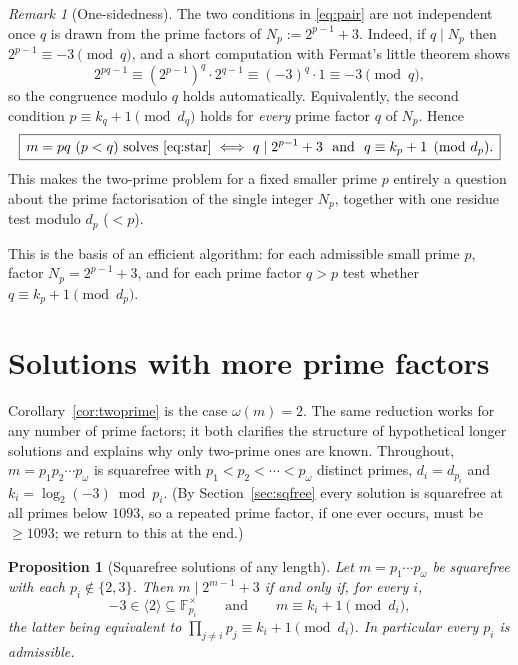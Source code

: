 \documentclass[11pt,reqno]{amsart}
\theoremstyle{plain}
\newtheorem{proposition}{Proposition}
\theoremstyle{definition}
\theoremstyle{remark}
\newtheorem{remark}{Remark}
\newcommand{\F}{\mathbb{F}}
\newcommand{\gen}[1]{\langle #1 \rangle}
\begin{document}
\begin{remark}[One-sidedness]\label{rem:onesided}
The two conditions in \eqref{eq:pair} are not independent once $q$ is drawn from the prime
factors of $N_{p}:=2^{p-1}+3$. Indeed, if $q\mid N_{p}$ then $2^{p-1}\equiv-3\pmod q$, and a
short computation with Fermat's little theorem shows
\[
2^{pq-1}\equiv (2^{p-1})^{q}\cdot 2^{q-1}\equiv(-3)^{q}\cdot 1\equiv -3\pmod q,
\]
so the congruence modulo $q$ holds automatically. Equivalently, the second condition
$p\equiv k_{q}+1\pmod{d_{q}}$ holds for \emph{every} prime factor $q$ of $N_{p}$. Hence
\[
\boxed{\,m=pq\ (p<q)\text{ solves }\eqref{eq:star}\iff q\mid 2^{p-1}+3\ \text{ and }\ q\equiv k_{p}+1\pmod{d_{p}}.\,}
\]
This makes the two-prime problem for a fixed smaller prime $p$ entirely a question about the
prime factorisation of the single integer $N_{p}$, together with one residue test modulo
$d_{p}$ ($<p$).
\end{remark}

This is the basis of an efficient algorithm: for each admissible small prime $p$, factor
$N_{p}=2^{p-1}+3$, and for each prime factor $q>p$ test whether $q\equiv k_{p}+1\pmod{d_{p}}$.

\section{Solutions with more prime factors}\label{sec:omega}

Corollary~\ref{cor:twoprime} is the case $\omega(m)=2$. The same reduction works for any number
of prime factors; it both clarifies the structure of hypothetical longer solutions and explains
why only two-prime ones are known. Throughout, $m=p_{1}p_{2}\cdots p_{\omega}$ is squarefree with
$p_{1}<p_{2}<\cdots<p_{\omega}$ distinct primes, $d_{i}=d_{p_{i}}$ and $k_{i}=\log_{2}(-3)\bmod
p_{i}$. (By Section~\ref{sec:sqfree} every solution is squarefree at all primes below $1093$, so
a repeated prime factor, if one ever occurs, must be $\ge 1093$; we return to this at the end.)

\begin{proposition}[Squarefree solutions of any length]\label{prop:omega}
Let $m=p_{1}\cdots p_{\omega}$ be squarefree with each $p_{i}\notin\{2,3\}$. Then
$m\mid 2^{m-1}+3$ if and only if, for every $i$,
\[
-3\in\gen{2}\subseteq\F_{p_{i}}^{\times}\qquad\text{and}\qquad m\equiv k_{i}+1\pmod{d_{i}},
\]
the latter being equivalent to $\displaystyle\prod_{j\ne i}p_{j}\equiv k_{i}+1\pmod{d_{i}}$. In
particular every $p_{i}$ is admissible.
\end{proposition}
\end{document}
